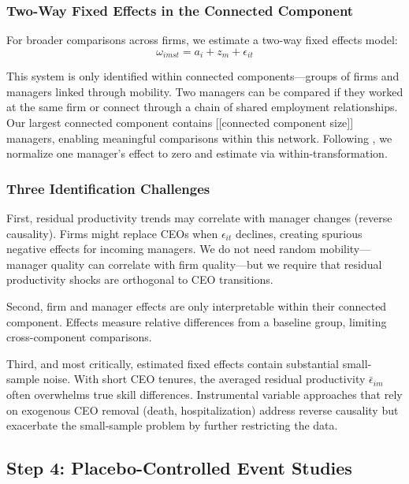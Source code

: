 \documentclass[11pt,a4paper]{article}
\begin{document}
\subsubsection{Two-Way Fixed Effects in the Connected Component}

For broader comparisons across firms, we estimate a two-way fixed effects model:
\begin{equation}
\omega_{imst} = a_i + z_m + \epsilon_{it}
\end{equation}

This system is only identified within connected components—groups of firms and managers linked through mobility. Two managers can be compared if they worked at the same firm or connect through a chain of shared employment relationships. Our largest connected component contains [[connected component size]] managers, enabling meaningful comparisons within this network. Following \citet{Abowd1999Econometrica}, we normalize one manager's effect to zero and estimate via within-transformation.

\subsubsection{Three Identification Challenges}

First, residual productivity trends may correlate with manager changes (reverse causality). Firms might replace CEOs when $\epsilon_{it}$ declines, creating spurious negative effects for incoming managers. We do not need random mobility—manager quality can correlate with firm quality—but we require that residual productivity shocks are orthogonal to CEO transitions.

Second, firm and manager effects are only interpretable within their connected component. Effects measure relative differences from a baseline group, limiting cross-component comparisons.

Third, and most critically, estimated fixed effects contain substantial small-sample noise. With short CEO tenures, the averaged residual productivity $\bar{\epsilon}_{im}$ often overwhelms true skill differences. Instrumental variable approaches that rely on exogenous CEO removal (death, hospitalization) address reverse causality but exacerbate the small-sample problem by further restricting the data.

\subsection{Step 4: Placebo-Controlled Event Studies}
\end{document}
